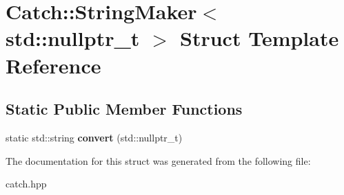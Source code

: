 \hypertarget{structCatch_1_1StringMaker_3_01std_1_1nullptr__t_01_4}{}\section{Catch\+:\+:String\+Maker$<$ std\+:\+:nullptr\+\_\+t $>$ Struct Template Reference}
\label{structCatch_1_1StringMaker_3_01std_1_1nullptr__t_01_4}
\subsection*{Static Public Member Functions}
\begin{DoxyCompactItemize}
\item 
\mbox{\label{structCatch_1_1StringMaker_3_01std_1_1nullptr__t_01_4_a131fbb1f5cd68c93aaf30d34e3519e9c}} 
static std\+::string {\bfseries convert} (std\+::nullptr\+\_\+t)
\end{DoxyCompactItemize}


The documentation for this struct was generated from the following file\+:\begin{DoxyCompactItemize}
\item 
catch.\+hpp\end{DoxyCompactItemize}

